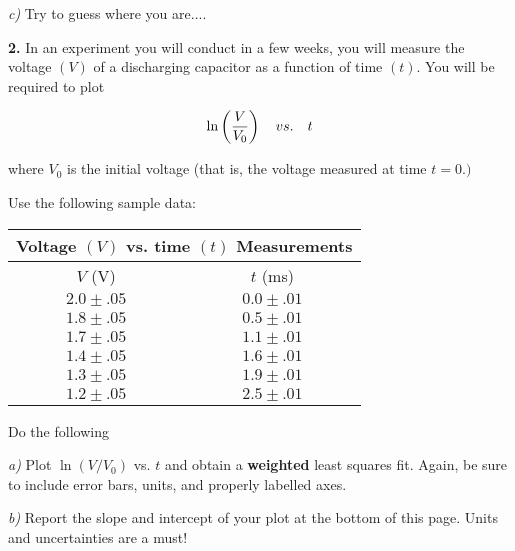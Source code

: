 \vspace*{0.5cm}
{\it c)} Try to guess where you are....
\newpage

\noindent
{\bf 2.} In an experiment you will conduct in a few weeks, you will measure
the voltage $(V)$ of a discharging capacitor as a function of time $(t).$
You will be required
to plot 

$$
\ln \left( {V \over V_0} \right) \quad vs. \quad t
$$

\noindent
where $V_0$ is the initial voltage (that is, the voltage measured at time 
$t=0.)$

\noindent
Use the following sample data:


\vspace*{0.5cm}
\begin{center}
\begin{tabular}{|c|c|}
\hline
\multicolumn{2}{|c|}{Voltage $(V)$ vs. time $(t)$ Measurements} \\
\hline\hline
$V$ (V) & $t$ (ms) \\
\hline
  $2.0 \pm .05$      &   $ 0.0 \pm .01$   \\
\hline    
  $1.8 \pm .05$      &   $ 0.5 \pm .01$   \\
\hline
  $1.7 \pm .05$     &   $ 1.1 \pm .01$   \\
\hline
  $1.4 \pm .05$     &  $ 1.6 \pm .01$    \\
\hline
  $1.3 \pm .05$     &  $1.9 \pm .01$    \\
\hline
  $1.2 \pm .05$      & $2.5 \pm .01$     \\
\hline

\end{tabular}
\end{center}

\vspace*{0.5cm}
\noindent
Do the following

{\it a)} Plot $\ln (V / V_0)$ vs. $t$ and obtain a {\bf weighted} least
squares fit. Again, be sure to include error bars, units, and properly
labelled axes.

\vspace*{0.5cm}
{\it b)} Report the slope and intercept of your plot at the bottom of this
page. Units and uncertainties are a must!





